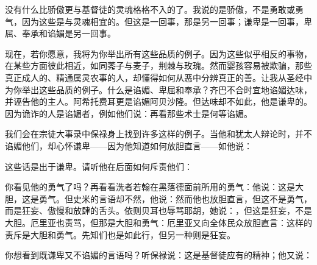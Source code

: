没有什么比骄傲更与基督徒的灵魂格格不入的了。我说的是骄傲，不是勇敢或勇气，因为这些是与灵魂相宜的。但这是一回事，那是另一回事；谦卑是一回事，卑屈、奉承和谄媚是另一回事。\par

现在，若你愿意，我将为你举出所有这些品质的例子。因为这些似乎相反的事物，在某些方面彼此相近，如同莠子与麦子，荆棘与玫瑰。然而婴孩容易被欺骗，那些真正成人的、精通属灵农事的人，却懂得如何从恶中分辨真正的善。让我从圣经中为你举出这些品质的例子。什么是谄媚、卑屈和奉承？齐巴不合时宜地谄媚达味，并诬告他的主人。阿希托费耳更是谄媚阿贝沙隆。但达味却不如此，他是谦卑的。因为诡诈的人是谄媚者，例如他们说：再看那些术士是何等谄媚。\par

我们会在宗徒大事录中保禄身上找到许多这样的例子。当他和犹太人辩论时，并不谄媚他们，却心怀谦卑——因为他知道如何放胆直言——如他说：\par

这些话是出于谦卑。请听他在后面如何斥责他们：\par

你看见他的勇气了吗？再看看洗者若翰在黑落德面前所用的勇气：他说：这是大胆，这是勇气。但史米的言语却不然，他说：然而他也放胆直言，但这不是勇气，而是狂妄、傲慢和放肆的舌头。依则贝耳也辱骂耶胡，她说：，但这是狂妄，不是大胆。厄里亚也责骂，但那是大胆和勇气：厄里亚又向全体民众放胆直言：这样的责斥是大胆和勇气。先知们也是如此行，但另一种则是狂妄。\par

你想看到既谦卑又不谄媚的言语吗？听保禄说：这是基督徒应有的精神；他又说：\par


